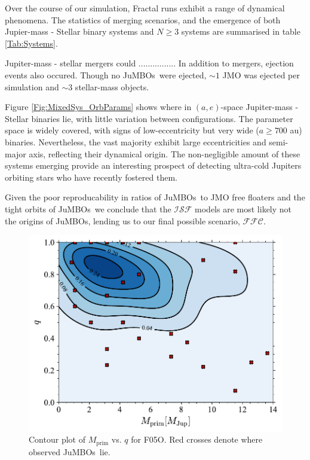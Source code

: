 \documentclass[aa]{lib/aa}
\newcommand{\jumbos}{\mbox{JuMBOs}}
\begin{document}
    Over the course of our simulation, Fractal runs exhibit a range of dynamical phenomena. The statistics of merging scenarios, and the emergence of both Jupier-mass - Stellar binary systems and $N\geq3$ systems are summarised in table \ref{Tab:Systems}.

    Jupiter-mass - stellar mergers could ................ In addition to mergers, ejection events also occured. Though no \jumbos\, were ejected, $\sim1$ JMO was ejected per simulation and $\sim 3$ stellar-mass objects.
    
    Figure \ref{Fig:MixedSys_OrbParams} shows where in $(a,e)$-space Jupiter-mass - Stellar binaries lie, with little variation between configurations. The parameter space is widely covered, with signs of low-eccentricity but very wide ($a\geq700$ au) binaries. Nevertheless, the vast majority exhibit large eccentricities and semi-major axis, reflecting their dynamical origin. The non-negligible amount of these systems emerging provide an interesting prospect of detecting ultra-cold Jupiters orbiting stars who have recently fostered them.

    Given the poor reproducability in ratios of \jumbos\, to JMO free floaters and the tight orbits of \jumbos\, we conclude that the $\mathcal{ISF}$ models are most likely not the origins of JuMBOs, lending us to our final possible scenario, $\mathcal{FFC}$.

   \begin{figure}
    \centering
        \includegraphics[width=\columnwidth]{figures/Fractal_rvir0.5_Obs_mass_distr.pdf}
        \caption{Contour plot of $M_{\mathrm{prim}}$ vs. $q$ for F05O. Red crosses denote where observed \jumbos\, lie.}
         \label{Fig:FractalObs_mdistr}
   \end{figure}
   
\end{document}
